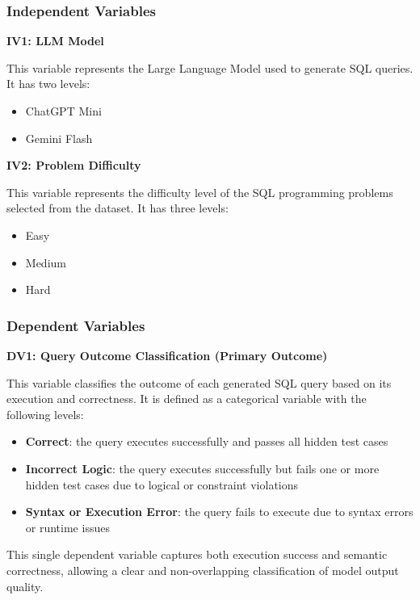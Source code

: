 \documentclass[11pt,a4paper]{article}
\begin{document}
    \subsubsection{Independent Variables}

    \textbf{IV1: LLM Model}

    This variable represents the Large Language Model used to generate SQL queries. It has two levels:
    \begin{itemize}
        \item ChatGPT Mini
        \item Gemini Flash
    \end{itemize}

    \textbf{IV2: Problem Difficulty}

    This variable represents the difficulty level of the SQL programming problems selected from the dataset. It has three levels:
    \begin{itemize}
        \item Easy
        \item Medium
        \item Hard
    \end{itemize}

    \subsubsection{Dependent Variables}

    \textbf{DV1: Query Outcome Classification (Primary Outcome)}

    This variable classifies the outcome of each generated SQL query based on its execution and correctness. It is defined as a categorical variable with the following levels:

    \begin{itemize}
        \item \textbf{Correct}: the query executes successfully and passes all hidden test cases
        \item \textbf{Incorrect Logic}: the query executes successfully but fails one or more hidden test cases due to logical or constraint violations
        \item \textbf{Syntax or Execution Error}: the query fails to execute due to syntax errors or runtime issues
    \end{itemize}

    This single dependent variable captures both execution success and semantic correctness, allowing a clear and non-overlapping classification of model output quality.
\end{document}
